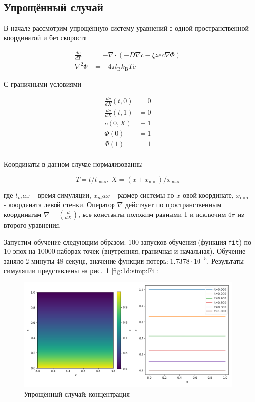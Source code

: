 \subsection{Упрощённый случай}

В начале рассмотрим упрощённую систему уравнений с одной пространственной координатой и без скорости

$$
    \begin{aligned}
        \frac{dc}{dT} & = -\nabla \cdot (- D\nabla c - \xi z e c \nabla \Phi) \\
        \nabla^2 \Phi & = -4 \pi l_\mathrm{B} k_\mathrm{B}T c
    \end{aligned}
$$

С граничными условиями

$$
    \begin{aligned}
        \frac{dc}{dX}(t, 0) & = 0 \\
        \frac{dc}{dX}(t, 1) & = 0 \\
        c(0, X)             & = 1 \\
        \Phi(0)             & = 1 \\
        \Phi(1)             & = 1 \\
    \end{aligned}
$$

Координаты в данном случае нормализованны

$$T = t/t_{\max},\;  X = (x+x_{\min})/x_{\max}$$

где $t_max$ -- время симуляции, $x_max$ -- размер системы по $x$-овой координате, $x_{\min}$ - координата левой стенки. Оператор $\nabla$ действует по пространственным координатам $\nabla = (\frac{d}{d X})$, все константы положим равными 1 и исключим $4\pi$ из второго уравнения.

Запустим обучение следующим образом: 100 запусков обучения (функция \texttt{fit}) по 10 эпох на 10000 наборах точек (внутренняя, граничная и начальная). Обучение заняло 2 минуты 48 секунд, значение функции потерь: $1.7378\cdot 10^{-5}$. Результаты симуляции представлены на рис.~\ref{fig:1d:simp:c} \ref{fig:1d:simp:Fi}:

\begin{figure}[ht]
    \includegraphics[width=\textwidth]{../plots/1-dim c simpified tanh 80,20.png}
    \caption{Упрощённый случай: концентрация}
    \label{fig:1d:simp:c}
\end{figure}

